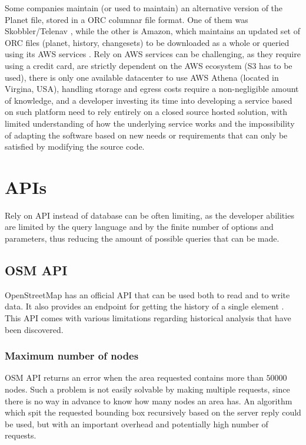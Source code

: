 \documentclass{Configuration_Files/PoliMi3i_thesis}
\begin{document}
Some companies maintain (or used to maintain) an alternative version of the Planet file, stored in a ORC columnar file format. One of them was Skobbler/Telenav \cite{OsmdataSkobblerNet2019}, while the other is Amazon, which maintains an updated set of ORC files (planet, history, changesets) to be downloaded as a whole or queried using its AWS services \cite{OpenStreetMapAWSRegistry}. Rely on AWS services can be challenging, as they require using a credit card, are strictly dependent on the AWS ecosystem (S3 has to be used), there is only one available datacenter to use AWS Athena (located in Virgina, USA), handling storage and egress costs require a non-negligible amount of knowledge, and a developer investing its time into developing a service based on such platform need to rely entirely on a closed source hosted solution, with limited understanding of how the underlying service works and the impossibility of adapting the software based on new needs or requirements that can only be satisfied by modifying the source code.

\section{APIs}

Rely on API instead of database can be often limiting, as the developer abilities are limited by the query language and by the finite number of options and parameters, thus reducing the amount of possible queries that can be made.

\subsection{OSM API}

OpenStreetMap has an official API \cite{APIOpenStreetMapWiki} that can be used both to read and to write data. It also provides an endpoint for getting the history of a single element \cite{APIV0OpenStreetMap}. This API comes with various limitations regarding historical analysis that have been discovered.

\subsubsection{Maximum number of nodes}

OSM API returns an error when the area requested contains more than $ 50000 $ nodes. Such a problem is not easily solvable by making multiple requests, since there is no way in advance to know how many nodes an area has. An algorithm which spit the requested bounding box recursively based on the server reply could be used, but with an important overhead and potentially high number of requests.
\end{document}
